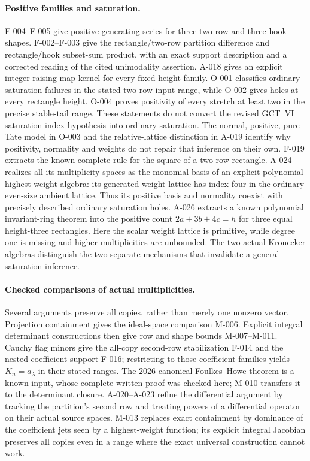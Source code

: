 \documentclass[11pt]{article}
\begin{document}
\paragraph{Positive families and saturation.}
F-004--F-005 give positive generating series for three two-row
and three hook shapes. F-002--F-003 give the rectangle/two-row
partition difference and rectangle/hook subset-sum product, with an
exact support description and a corrected reading of the cited
unimodality assertion. A-018 gives an explicit integer raising-map
kernel for every fixed-height family. O-001 classifies ordinary
saturation failures in the stated two-row-input range, while O-002
gives holes at every rectangle height. O-004 proves positivity of
every stretch at least two in the precise stable-tail range.
These statements do not convert the revised GCT~VI saturation-index
hypothesis into ordinary saturation. The normal, positive, pure-Tate
model in O-003 and the relative-lattice distinction in A-019
identify why positivity, normality and weights do not repair that
inference on their own. F-019 extracts the known complete rule for
the square of a two-row rectangle. A-024 realizes all its multiplicity
spaces as the monomial basis of an explicit polynomial highest-weight
algebra: its generated weight lattice has index four in the ordinary
even-size ambient lattice. Thus its positive basis and normality
coexist with precisely described ordinary saturation holes.
A-026 extracts a known polynomial invariant-ring theorem into the
positive count \(2a+3b+4c=h\) for three equal height-three
rectangles. Here the scalar weight lattice is primitive, while
degree one is missing and higher multiplicities are unbounded.
The two actual Kronecker algebras distinguish the two separate
mechanisms that invalidate a general saturation inference.

\paragraph{Checked comparisons of actual multiplicities.}
Several arguments preserve all copies, rather than merely one
nonzero vector. Projection containment gives the ideal-space
comparison M-006. Explicit integral determinant constructions
then give row and shape bounds M-007--M-011. Cauchy flag minors
give the all-copy second-row stabilization F-014 and the nested
coefficient support F-016; restricting to those coefficient
families yields \(K_n=a_\lambda\) in their stated ranges.
The 2026 canonical Foulkes--Howe theorem is a known input, whose
complete written proof was checked here; M-010 transfers it to
the determinant closure. A-020--A-023 refine the differential
argument by tracking the partition's second row and treating powers
of a differential operator on their actual source spaces.
M-013 replaces exact containment by dominance of the coefficient
jets seen by a highest-weight function; its explicit integral
Jacobian preserves all copies even in a range where the exact
universal construction cannot work.
\end{document}
